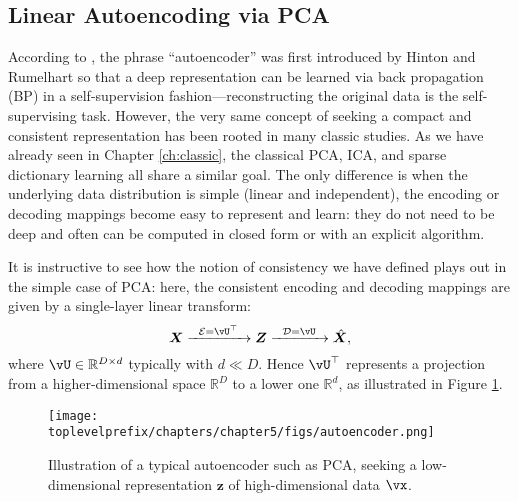 \documentclass[\toplevelprefix/book-main.tex]{subfiles}
\begin{document}
\subsection{Linear Autoencoding via PCA}
According to \cite{Baldi2011}, the phrase ``autoencoder'' was first
introduced by Hinton and Rumelhart \cite{Rumelhart1986} so that a
deep representation can be learned via back propagation (BP) in a self-supervision fashion---reconstructing the original data is the self-supervising task. However, the very same concept of seeking a compact and consistent representation has been rooted in many classic studies. As we have already seen in Chapter \ref{ch:classic}, the classical PCA, ICA, and sparse dictionary learning all share a similar goal. The only difference is when the underlying data distribution is simple (linear and
independent), the encoding or decoding mappings become easy to represent and
learn: they do not need to be deep and often can be computed in closed form or
with an explicit algorithm.

It is instructive to see how the notion of consistency we have
defined plays out in the simple case of PCA:
here, the consistent encoding and decoding mappings are given by a single-layer
linear transform:
\begin{equation}
  \X \xrightarrow{\hspace{2mm} \mathcal{E} = \vU^\top \hspace{2mm}}
  \Z \xrightarrow{\hspace{2mm} \mathcal{D} = \vU \hspace{2mm}}   \hat{\X},
  \label{eqn:autoencoding-PCA-2}
\end{equation}
where $\vU \in \mathbb{R}^{D\times d}$ typically with $d\ll D$. Hence
$\vU^\top $ represents a projection from a higher-dimensional space
$\mathbb{R}^{D}$  to a lower one $\mathbb{R}^{d}$, as illustrated in
Figure \ref{fig:AE}.
\begin{figure}
  \centering \texttt{[image: \\toplevelprefix/chapters/chapter5/figs/autoencoder.png]}
  \caption{Illustration of a typical autoencoder such as PCA, seeking
  a low-dimensional representation $\bm{z}$ of high-dimensional data $\vx$.}
  \label{fig:AE}
\end{figure}
\end{document}

